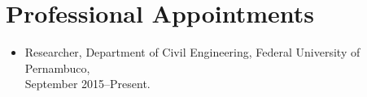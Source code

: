   \ifdefined\ispdf
    \section*{Professional Appointments}

    \begin{itemize}
    \item Researcher, Department of Civil Engineering, Federal University of Pernambuco,\\
          September 2015--Present.
    \end{itemize}
% 
% 
% 
% 
  \fi

% 


